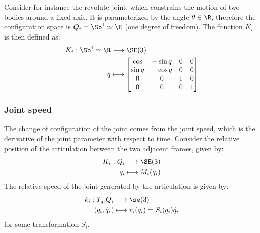 Consider for instance the revolute joint, which constrains the motion of two bodies around a fixed axis. It is parameterized by the angle $\theta\in\R$, therefore the configuration space is $Q_i=\Sb^1\simeq\R$ (one degree of freedom). The function $K_i$ is then defined as:
\begin{equation*}
    \begin{aligned}
        K_i: \Sb^1\simeq\R &\longrightarrow \SE(3)\\
        q &\longmapsto \begin{bmatrix}
            \cos  & -\sin q & 0 & 0\\
            \sin q & \phantom{-}\cos q & 0 & 0\\
            0 & 0 & 1 & 0\\
            0 & 0 & 0 & 1
        \end{bmatrix}
    \end{aligned}
\end{equation*}

\subsubsection{Joint speed}
The change of configuration of the joint comes from the joint speed, which is the derivative of the joint parameter with respect to time. Consider the relative position of the articulation between the two adjacent frames, given by:
\begin{equation*}
    \begin{aligned}
        K_i : Q_i &\longrightarrow \SE(3)\\
        q_i &\longmapsto M_i(q_i)
    \end{aligned}
\end{equation*}
The relative speed of the joint generated by the articulation is given by:
\begin{equation*}
    \begin{aligned}
        k_i:T_{q_i}Q_i &\longrightarrow \se(3)\\
        (q_i, \dot{q}_i) &\longmapsto v_i(q_i) = S_i(q_i)\dot{q}_i
    \end{aligned}
\end{equation*}
for some transformation $S_i$.

